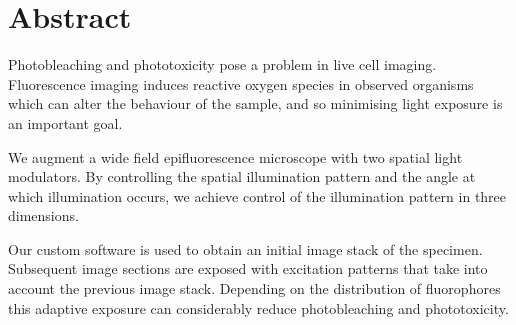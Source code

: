 \section*{Abstract}
\begin{summary}
Photobleaching and phototoxicity pose a problem in live cell
imaging. Fluorescence imaging induces reactive oxygen species in
observed organisms which can alter the behaviour of the sample, and so
minimising light exposure is an important goal.

We augment a wide field epifluorescence microscope with two spatial
light modulators. By controlling the spatial illumination pattern and
the angle at which illumination occurs, we achieve control of the
illumination pattern in three dimensions.

Our custom software is used to obtain an initial image stack of the
specimen. Subsequent image sections are exposed with excitation
patterns that take into account the previous image stack. Depending on
the distribution of fluorophores this adaptive exposure can
considerably reduce photobleaching and phototoxicity.
\end{summary}
